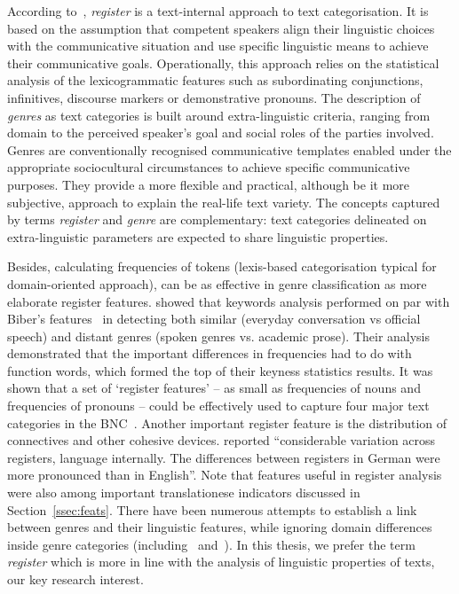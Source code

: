 According to~\citet{Lee01}, \textit{register} is a text-internal approach to text categorisation. It is based on the assumption that competent speakers align their linguistic choices with the communicative situation and use specific linguistic means to achieve their communicative goals. Operationally, this approach relies on the statistical analysis of the lexicogrammatic features such as subordinating conjunctions, infinitives, discourse markers or demonstrative pronouns. %
The description of \textit{genres} as text categories is built around extra-linguistic criteria, ranging from domain to the perceived speaker's goal and social roles of the parties involved. Genres are conventionally recognised communicative templates enabled under the appropriate sociocultural circumstances to achieve specific communicative purposes. They provide a more flexible and practical, although be it more subjective, approach to explain the real-life text variety. 
The concepts captured by terms \textit{register} and \textit{genre} are complementary: text categories delineated on extra-linguistic parameters are expected to share linguistic properties. 

Besides, calculating frequencies of tokens (lexis-based categorisation typical for domain-oriented approach), can be as effective in genre classification as more elaborate register features. \citet{Xiao2005} showed that keywords analysis performed on par with Biber's features~\cite{Biber1988} in detecting both similar (everyday conversation vs official speech) and distant genres (spoken genres vs. academic prose). Their analysis demonstrated that the important differences in frequencies had to do with function words, which formed the top of their keyness statistics results. It was shown that a set of `register features' -- as small as frequencies of nouns and frequencies of pronouns -- could be effectively used to capture four major text categories in the BNC~\cite{Lijffijt2017}. Another important register feature is the distribution of connectives and other cohesive devices. \citet[p.286]{Kunz2017} reported ``considerable variation across registers, language internally. The differences between registers in German were more pronounced than in English''. Note that features useful in register analysis were also among important translationese indicators discussed in Section~\ref{ssec:feats}. 
There have been numerous attempts to establish a link between genres and their linguistic features, while ignoring domain differences inside genre categories (including~\citet{Lee01} and~\citet{Braslavski2010}). 
In this thesis, we prefer the term \textit{register} which is more in line with the analysis of linguistic properties of texts, our key research interest.

